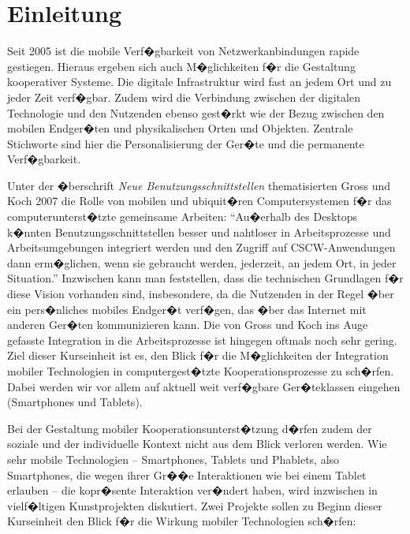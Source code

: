 \section{Einleitung}
Seit 2005 ist die mobile Verf�gbarkeit von Netzwerkanbindungen rapide gestiegen. Hieraus ergeben sich auch M�glichkeiten f�r die Gestaltung kooperativer Systeme. Die digitale Infrastruktur wird fast an jedem Ort und zu jeder Zeit verf�gbar. Zudem wird die Verbindung zwischen der digitalen Technologie und den Nutzenden ebenso gest�rkt wie der Bezug zwischen den mobilen Endger�ten und physikalischen Orten und Objekten. Zentrale Stichworte sind hier die Personalisierung der Ger�te und die permanente Verf�gbarkeit.  

Unter der �berschrift \emph{Neue Benutzungsschnittstellen} thematisierten Gross und Koch 2007 die Rolle von mobilen und ubiquit�ren Computersystemen f�r das computerunterst�tzte gemeinsame Arbeiten: ``Au�erhalb des Desktops k�nnten Benutzungsschnittstellen besser und nahtloser in Arbeitsprozesse und Arbeitsumgebungen integriert werden und den Zugriff auf CSCW-Anwendungen dann erm�glichen, wenn sie gebraucht werden, jederzeit, an jedem Ort, in jeder Situation.''  Inzwischen kann man feststellen, dass die technischen Grundlagen f�r diese Vision vorhanden sind, insbesondere, da die Nutzenden in der Regel �ber ein pers�nliches mobiles Endger�t verf�gen, das �ber das Internet mit anderen Ger�ten kommunizieren kann. Die von Gross und Koch ins Auge gefasste Integration in die Arbeitsprozesse ist hingegen oftmals noch sehr gering. Ziel dieser Kurseinheit ist es, den Blick f�r die M�glichkeiten der Integration mobiler Technologien in computergest�tzte Kooperationsprozesse zu sch�rfen. Dabei werden wir vor allem auf aktuell weit verf�gbare Ger�teklassen eingehen (Smartphones und Tablets).

Bei der Gestaltung mobiler Kooperationsunterst�tzung d�rfen zudem der soziale und der individuelle Kontext nicht aus dem Blick verloren werden. Wie sehr mobile Technologien -- Smartphones, Tablets und Phablets, also Smartphones, die wegen ihrer Gr��e Interaktionen wie bei einem Tablet erlauben -- die kopr�sente Interaktion ver�ndert haben, wird inzwischen in vielf�ltigen Kunstprojekten diskutiert. Zwei Projekte sollen zu Beginn dieser Kurseinheit den Blick f�r die Wirkung mobiler Technologien sch�rfen:

